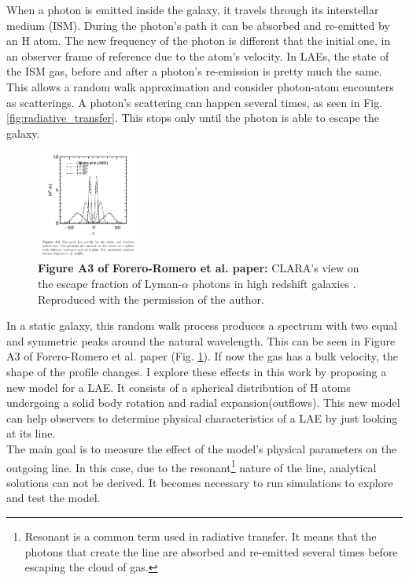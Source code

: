 \documentclass[twocolappendix]{latex/emulateapj}
\begin{document}
When a \lya photon is emitted inside the galaxy, it travels through its interstellar medium (ISM). During the photon's path it can be absorbed and re-emitted by an H atom. The new frequency of the photon is different that the initial one, in an observer frame of reference due to the atom's velocity. In LAEs, the state of the ISM gas, before and after a photon's re-emission is pretty much the same. This allows a random walk approximation and consider photon-atom encounters as scatterings. A photon's scattering can happen several times, as seen in Fig. \ref{fig:radiative_transfer}. This stops only until the photon is able to escape the galaxy. \\

\begin{figure}[h!]
	\begin{center}
		\includegraphics[width=0.3\textwidth]{./figures/static}
	\end{center}
	\caption{\textbf{Figure A3 of Forero-Romero et al. paper:} CLARA's view on the escape fraction of Lyman-$\alpha$ photons in high redshift galaxies \cite{CLARA}. Reproduced with the permission of the author.
		\label{fig:static}}
\end{figure}

In a static galaxy, this random walk process produces a spectrum with two equal and symmetric peaks around the natural \lya wavelength. This can be seen in Figure A3 of Forero-Romero et al. paper \cite{CLARA} (Fig. \ref{fig:static}). If now the gas has a bulk velocity, the shape of the \lya profile changes. I explore these effects in this work by proposing a new model for a LAE. It consists of a spherical distribution of H atoms undergoing a solid body rotation and radial expansion(outflows). This new model can help observers to determine physical characteristics of a LAE by just looking at its \lya line. \\

The main goal is to measure the effect of the model's physical parameters on the outgoing \lya line. In this case, due to the resonant\footnote{Resonant is a common term used in radiative transfer. It means that the photons that create the line are absorbed and re-emitted several times before escaping the cloud of gas.} nature of the \lya line, analytical solutions can not be derived. It becomes necessary to run simulations to explore and test the model. \\
\end{document}
